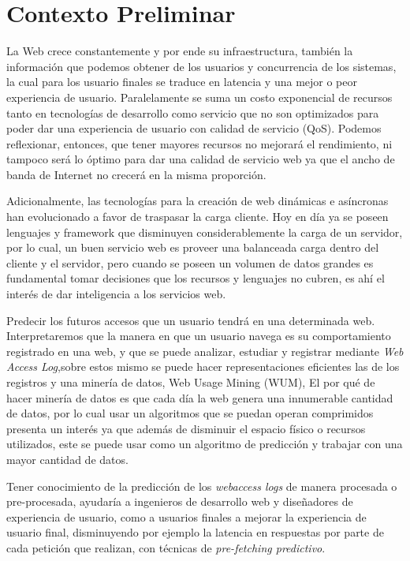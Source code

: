 \section{Contexto Preliminar} 
\label{sec:preliminar}


  La Web crece constantemente y por ende su infraestructura, también la información que podemos obtener de los  usuarios y  concurrencia de los sistemas, la cual para los usuario finales se traduce en latencia y una mejor o peor experiencia de usuario. Paralelamente se suma un costo exponencial de recursos tanto en tecnologías de desarrollo como servicio que no son optimizados para poder dar una experiencia de usuario con calidad de servicio (QoS). Podemos reflexionar, entonces, que tener mayores recursos no mejorará el rendimiento, ni tampoco será lo óptimo para dar una calidad de servicio web ya que el ancho de banda de Internet no crecerá en la misma proporción.
   
  Adicionalmente, las tecnologías para la creación de web dinámicas e asíncronas han evolucionado a favor de traspasar la carga cliente.
  Hoy en día ya se poseen lenguajes y framework que disminuyen considerablemente la carga de un servidor, por lo cual, un buen servicio web es proveer una balanceada carga dentro del cliente y el servidor, pero cuando se poseen un volumen de datos grandes es fundamental tomar decisiones que los recursos y lenguajes no cubren, es ahí el interés de dar inteligencia a los servicios web.

  Predecir los futuros accesos que un usuario tendrá en una determinada web. Interpretaremos que la manera en que un usuario navega es su comportamiento registrado en una web, y que se puede analizar, estudiar y registrar mediante \emph{Web Access Log},sobre estos mismo se puede hacer representaciones eficientes\cite{Claude2014} las de los registros y una minería de datos, Web Usage Mining (WUM), El por qué de hacer minería de datos es que cada día la web genera una innumerable cantidad de datos, por lo cual usar un algoritmos que se puedan operan comprimidos presenta un interés ya que además de disminuir el espacio físico o recursos utilizados, este se puede usar como un algoritmo de predicción y trabajar con una mayor cantidad de datos.
  
  Tener conocimiento de la predicción de los \emph{webaccess logs} de manera procesada o pre-procesada, ayudaría a ingenieros de desarrollo web y diseñadores de experiencia de usuario, como a  usuarios finales a mejorar la experiencia de usuario final, disminuyendo por ejemplo la latencia en respuestas por parte de cada petición que realizan, con técnicas de \emph{pre-fetching predictivo}.
  

